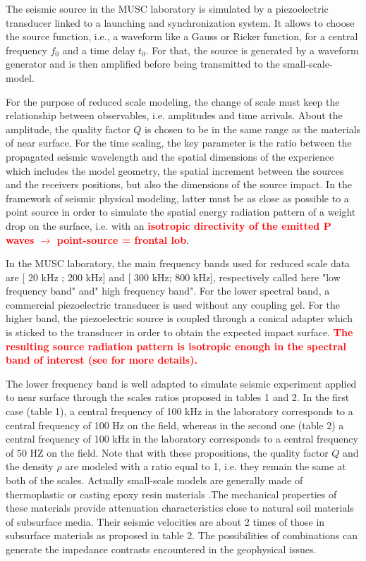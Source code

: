 \documentclass[manuscript,revised]{geophysics}
\newcommand{\correction}[1]{\textbf{\textcolor{red}{ #1}}}
\begin{document}
\noindent The seismic source in the MUSC laboratory is simulated by a piezoelectric transducer linked to a launching and synchronization system. It allows to choose the source function, i.e., a waveform like a Gauss or Ricker function, for a central frequency $f_{0}$ and a time delay $t_{0}$. For that, the source is generated by a waveform generator and is then amplified before being transmitted to the small-scale-model.

\noindent For the purpose of reduced scale modeling, the change of scale must keep the relationship between observables, i.e. amplitudes and time arrivals. About the amplitude, the quality factor $Q$ is chosen to be in the same range as the materials of near surface. For the time scaling, the key parameter is the ratio between the propagated seismic wavelength and the spatial dimensions of the experience which includes the model geometry, the spatial increment between the sources and the receivers positions, but also the dimensions of the source impact. In the framework of seismic physical modeling, latter must be as close as possible to a point source in order to simulate the spatial energy radiation pattern of a weight drop on the surface, i.e. with an \correction{isotropic directivity of the emitted P waves $\rightarrow$ point-source = frontal lob}.

\noindent In the MUSC laboratory, the main frequency bands used for reduced scale data are [ 20 kHz ; 200 kHz] and [ 300 kHz; 800 kHz], respectively called here "low frequency band" and" high frequency band". For the lower spectral band, a commercial piezoelectric transducer is used without any coupling gel. For the higher band, the piezoelectric source is coupled through a conical adapter which is sticked to the transducer in order to obtain the expected impact surface. \correction{The resulting source radiation pattern is isotropic enough in the spectral band of interest (see \citep{Bretaudeau_SSM_2011} for more details).}

\noindent The lower frequency band is well adapted to simulate seismic experiment applied to near surface through the scales ratios proposed in tables 1 and 2. In the first case (table 1), a central frequency of 100 kHz in the laboratory corresponds to a central frequency of 100 Hz on the field, whereas in the second one (table 2) a central frequency of 100 kHz in the laboratory corresponds to a central frequency of 50 HZ on the field. Note that with these propositions, the  quality factor $Q$ and the density $\rho$ are modeled with a ratio equal to 1, i.e. they remain the same at both of the scales. Actually small-scale models are generally made of thermoplastic or casting epoxy resin materials \citep{Bretaudeau_FWI_2013}.The mechanical properties of these materials provide attenuation characteristics close to natural soil materials of subsurface media. Their seismic velocities are about 2 times of those in subsurface materials as proposed in table 2. The possibilities of combinations can generate the impedance contrasts encountered in the geophysical issues. 
\end{document}
